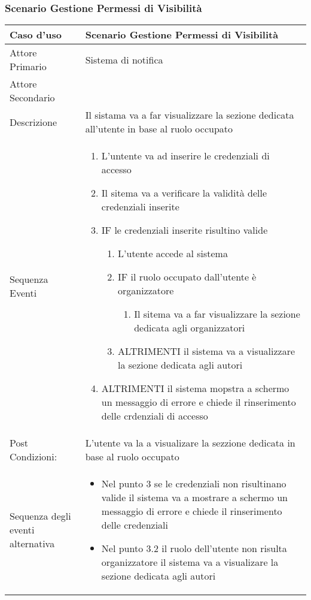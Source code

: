 \subsubsection{Scenario Gestione Permessi di Visibilità}
\begin{tabular}{|p{3cm}|p{7cm}|}
\hline 
\rowcolor{Orchid}
Caso d'uso & Scenario Gestione Permessi di Visibilità \\
\hline
Attore Primario & Sistema di notifica\\
\hline
Attore Secondario & \\
\hline
Descrizione & Il sistama va a far visualizzare la sezione dedicata all'utente in base al ruolo occupato\\
\hline
 Sequenza Eventi & 
\begin{enumerate}
  \item L'untente va ad inserire le credenziali di accesso
  \item Il sitema va a verificare la validità delle credenziali inserite 
  \item IF le credenziali inserite risultino valide
  \begin{enumerate}
    \item L'utente accede al sistema
    \item IF il ruolo occupato dall'utente è organizzatore
    \begin{enumerate}
      \item Il sitema va a far visualizzare la sezione dedicata agli organizzatori
    \end{enumerate}
  \item ALTRIMENTI il sistema va a visualizzare la sezione dedicata agli autori
  \end{enumerate}
\item ALTRIMENTI il sistema mopstra a schermo un messaggio di errore e chiede il rinserimento delle crdenziali di accesso
\end{enumerate}\\
\hline
Post Condizioni: & L'utente va la a visualizare la sezzione dedicata in base al ruolo occupato\\
\hline
Sequenza degli eventi alternativa & \begin{itemize}
  \item Nel punto 3 se le credenziali non risultinano valide il sistema va a mostrare a schermo un messaggio di errore e chiede il rinserimento delle credenziali
  \item Nel punto 3.2 il ruolo dell'utente non risulta organizzatore il sistema va a visualizare la sezione dedicata agli autori
\end{itemize} \\
  \hline
\end{tabular}\\

